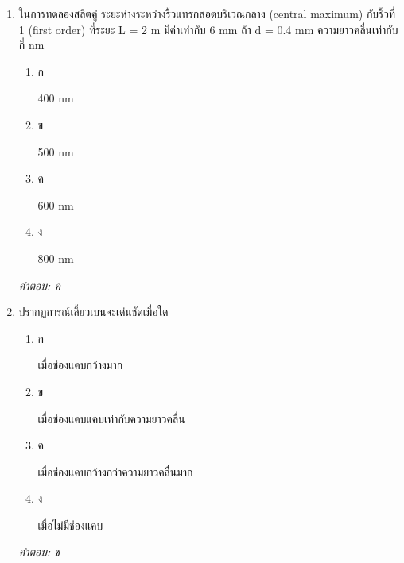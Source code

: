 \documentclass[12pt]{article}
\begin{document}
\begin{enumerate}[label=\arabic*., itemsep=0.5\baselineskip, topsep=0.5\baselineskip, leftmargin=*]
\item ในการทดลองสลิตคู่ ระยะห่างระหว่างริ้วแทรกสอดบริเวณกลาง (central maximum) กับริ้วที่ 1 (first order) ที่ระยะ L = 2 m มีค่าเท่ากับ 6 mm ถ้า d = 0.4 mm ความยาวคลื่นเท่ากับกี่ nm
\begin{enumerate}[label=\alph*)., itemsep=0.3\baselineskip, topsep=0.3\baselineskip]
\item ก\ 
\begin{minipage}[t]{0.9\linewidth}
\raggedright 400 nm
\end{minipage}
\item ข\ 
\begin{minipage}[t]{0.9\linewidth}
\raggedright 500 nm
\end{minipage}
\item ค\ 
\begin{minipage}[t]{0.9\linewidth}
\raggedright 600 nm
\end{minipage}
\item ง\ 
\begin{minipage}[t]{0.9\linewidth}
\raggedright 800 nm
\end{minipage}
\end{enumerate}
\vspace{-0.3\baselineskip}
\begin{small}
\textit{คำตอบ: ค}
\end{small}

\item ปรากฏการณ์เลี้ยวเบนจะเด่นชัดเมื่อใด
\begin{enumerate}[label=\alph*)., itemsep=0.3\baselineskip, topsep=0.3\baselineskip]
\item ก\ 
\begin{minipage}[t]{0.9\linewidth}
\raggedright เมื่อช่องแคบกว้างมาก
\end{minipage}
\item ข\ 
\begin{minipage}[t]{0.9\linewidth}
\raggedright เมื่อช่องแคบแคบเท่ากับความยาวคลื่น
\end{minipage}
\item ค\ 
\begin{minipage}[t]{0.9\linewidth}
\raggedright เมื่อช่องแคบกว้างกว่าความยาวคลื่นมาก
\end{minipage}
\item ง\ 
\begin{minipage}[t]{0.9\linewidth}
\raggedright เมื่อไม่มีช่องแคบ
\end{minipage}
\end{enumerate}
\vspace{-0.3\baselineskip}
\begin{small}
\textit{คำตอบ: ข}
\end{small}


\end{enumerate}
\end{document}
